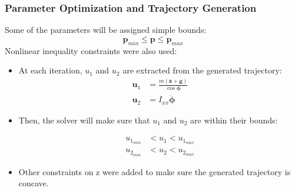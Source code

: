 \documentclass{thesisbeamer}
\newcommand\Fontvi{\fontsize{9}{10}\selectfont}
\begin{document}
\begin{frame}
	\frametitle{Parameter Optimization and Trajectory Generation}
	\Fontvi
	
	Some of the parameters will be assigned simple bounds:
	\begin{equation}
		\bm{p}_{min} \leq \bm{p} \leq \bm{p}_{max}
	\end{equation}
Nonlinear inequality constraints were also used:
	\begin{itemize}
		\item At each iteration, $u_1$ and $u_2$ are extracted from the generated trajectory:
		\begin{align}
				\bm{u}_1 &= \frac{m(\ddot{\bm{z}} + \bm{g})}{\cos \bm{\phi}}\\
				\bm{u}_2 &= I_{xx} \ddot{\bm{\phi}}
			\end{align}

		\item Then, the solver will make sure that $u_1$ and $u_2$ are within their bounds:
		
		\begin{align}
			u_{1_{min}} &< u_1 < u_{1_{max}} \\
			u_{2_{min}} &< u_2 < u_{2_{max}} 
		\end{align}

		\item Other constraints on z were added to make sure the generated trajectory is concave.

	\end{itemize}
	
\end{frame}
\end{document}
